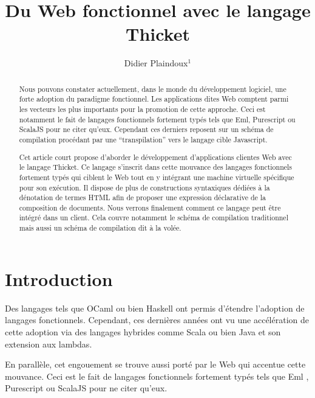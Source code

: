 \documentclass[twoside,a4paper]{article}
\title{ Du Web fonctionnel avec le langage Thicket }
\author{Didier Plaindoux$^1$}
\affiliation{\begin{tabular}{rr} 
    \\ 1:  Fungus, Le village 31430 Gratens, France
    \\     {\tt d.plaindoux@fungus.fr}
\end{tabular}}
\begin{document}
\setcounter{page}{1}
\maketitle

\begin{abstract}
Nous pouvons  constater actuellement,  dans le monde  du développement
logiciel,   une  forte   adoption   du   paradigme  fonctionnel.   Les
applications  dites   Web  comptent  parmi  les   vecteurs  les  plus
importants pour la promotion de  cette approche. Ceci est notamment le
fait de langages fonctionnels fortement typés tels que Eml, Purescript
ou ScalaJS pour  ne citer qu’eux. Cependant ces  derniers reposent sur
un schéma  de compilation  procédant par  une “transpilation”  vers le
langage cible Javascript.

Cet article  court propose  d'aborder le  développement d'applications
clientes Web avec le langage  Thicket. Ce langage s’inscrit dans cette
mouvance des langages fonctionnels fortement  typés qui ciblent le Web
tout  en  y  intégrant  une  machine  virtuelle  spécifique  pour  son
exécution. Il dispose  de plus de constructions  syntaxiques dédiées à
la  dénotation  de  termes  HTML   afin  de  proposer  une  expression
déclarative de  la composition  de documents. Nous  verrons finalement
comment  ce langage  peut être  intégré  dans un  client. Cela  couvre
notamment le schéma  de compilation traditionnel mais  aussi un schéma
de compilation dit à la volée.
\end{abstract}

\section{Introduction}

Des   langages   tels  que   OCaml   \cite{ocaml}   ou  bien   Haskell
\cite{haskell}   ont   permis   d'étendre   l'adoption   de   langages
fonctionnels. Cependant, ces dernières  années ont vu une accélération
de cette adoption  via des langages hybrides  comme Scala \cite{scala}
ou bien Java \cite{java} et son extension aux lambdas.

En parallèle,  cet engouement  se trouve  aussi porté  par le  Web qui
accentue cette  mouvance. Ceci  est le  fait de  langages fonctionnels
fortement typés tels que  Eml \cite{elm}, Purescript \cite{purescript}
ou ScalaJS \cite{scalajs} pour ne citer qu’eux.
\end{document}
